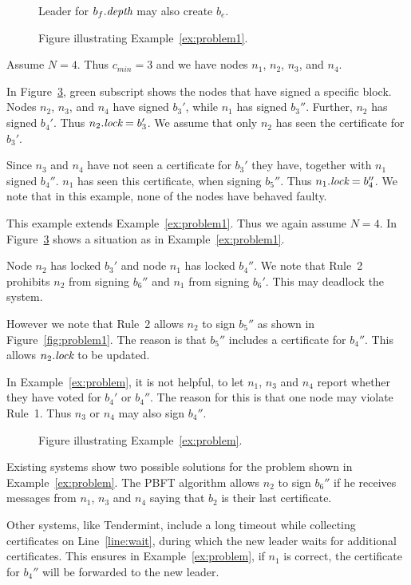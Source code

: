 \begin{figure}[h!]
	\centering
	
	\caption{Leader for $b_f.\textit{depth}$ may also create $b_e$.}
	\label{fig:newblock}
\end{figure}
	
\begin{figure}[h!]
	\centering
	
	\caption{Figure illustrating Example~\ref{ex:problem1}.}
	\label{fig:problem}
\end{figure}

\begin{example}\label{ex:problem1}
Assume $N=4$. Thus $c_{min}=3$ and we have nodes $n_1$, $n_2$, $n_3$, and $n_4$.

In Figure~\ref{fig:problem}, green subscript shows the nodes that have signed a specific block. Nodes $n_2$, $n_3$, and $n_4$ have signed $b_3'$, while $n_1$ has signed $b_3''$. Further, $n_2$ has signed $b_4'$. Thus $n_2.\textit{lock}=b_3'$. We assume that only $n_2$ has seen the certificate for $b_3'$.

Since $n_3$ and $n_4$ have not seen a certificate for $b_3'$ they have, together with $n_1$ signed $b_4''$. $n_1$ has seen this certificate, when signing $b_5''$. Thus $n_1.\textit{lock}=b_4''$. We note that in this example, none of the nodes have behaved faulty.
\end{example}	


\begin{example}\label{ex:problem}
This example extends Example~\ref{ex:problem1}. Thus we again assume $N=4$.
In Figure~\ref{fig:problem} shows a situation as in Example~\ref{ex:problem1}.

Node $n_2$ has locked $b_3'$ and node $n_1$ has locked $b_4''$.
We note that Rule~2 prohibits $n_2$ from signing $b_6''$ and $n_1$ from signing $b_6'$. This may deadlock the system. 

However we note that Rule~2 allows $n_2$ to sign $b_5''$ as shown in Figure~\ref{fig:problem1}. The reason is that $b_5''$ includes a certificate for $b_4''$. This allows $n_2.\textit{lock}$ to be updated.
\end{example}

In Example~\ref{ex:problem}, it is not helpful, to let $n_1$, $n_3$ and $n_4$ report whether they have voted for $b_4'$ or $b_4''$. The reason for this is that one node may violate Rule~1. Thus $n_3$ or $n_4$ may also sign $b_4''$. 
\begin{figure}[h!]
	\centering
	
	\caption{Figure illustrating Example~\ref{ex:problem}.}
	\label{fig:problem}
\end{figure}	

Existing systems show two possible solutions for the problem shown in Example~\ref{ex:problem}. The PBFT algorithm allows $n_2$ to sign $b_6''$ if he receives messages from $n_1$, $n_3$ and $n_4$ saying that $b_2$ is their last certificate.

Other systems, like Tendermint, include a long timeout while collecting certificates on Line~\ref{line:wait}, during which the new leader waits for additional certificates. This ensures in Example~\ref{ex:problem}, if $n_1$ is correct, the certificate for $b_4''$ will be forwarded to the new leader.
